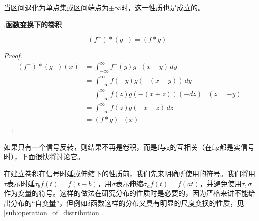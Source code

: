 当区间退化为单点集或区间端点为$\pm\infty$时，这一性质也是成立的。

.\textbf{函数变换下的卷积}
\begin{proposition}[信号反转下的卷积]
    \[(f^-)*(g^-)=(f*g)^-\]
\end{proposition}
\begin{proof}
    \begin{align*}
    (f^-)*(g^-)(x) & =\int_{-\infty}^{\infty}f^-(y)g^-(x-y)\,dy          \\
                   & =\int_{-\infty}^{\infty}f(-y)g(-(x-y))\,dy          \\
                   & =\int_{-\infty}^{\infty}f(z)g(-(x+z))(-dz) & (z=-y) \\
                   & =\int_{-\infty}^{\infty}f(z)g(-x-z)\,dz             \\
                   & =(f*g)^-(x)
\end{align*}
\end{proof}

如果只有一个信号反转，则结果不再是卷积，而是f与g的互相关（在f,g都是实信号时），下面很快将讨论它。

在建立卷积在信号时延或伸缩下的性质前，我们先来明确所使用的符号。我们将用$\tau$表示时延$\tau_b f(t)=f(t-b)$，用$\sigma$表示伸缩$\sigma_a f(t)=f(at)$，并避免使用$\tau,\sigma$作为变量的符号。这样的做法在研究分布的性质时是必要的，因为严格来讲不能给出分布的“自变量”，但例如$\delta$函数这样的分布又具有明显的尺度变换的性质，见\ref{sub:operation_of_distribution}.

